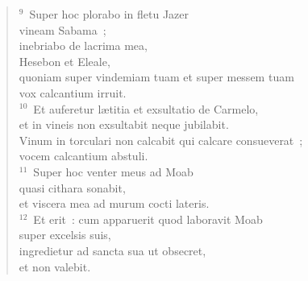 \begin{flushleft}
\begin{verse}
${}^{9}$~Super hoc plorabo in fletu Jazer\\ vineam Sabama~;\\ inebriabo de lacrima mea,\\ Hesebon et Eleale,\\ quoniam super vindemiam tuam et super messem tuam\\ vox calcantium irruit.\\
${}^{10}$~Et auferetur l\ae titia et exsultatio de Carmelo,\\ et in vineis non exsultabit neque jubilabit.\\ Vinum in torculari non calcabit qui calcare consueverat~;\\ vocem calcantium abstuli.\\
${}^{11}$~Super hoc venter meus ad Moab\\ quasi cithara sonabit,\\ et viscera mea ad murum cocti lateris.\\
${}^{12}$~Et erit~: cum apparuerit quod laboravit Moab\\ super excelsis suis,\\ ingredietur ad sancta sua ut obsecret,\\ et non valebit.\end{verse}\end{flushleft}


